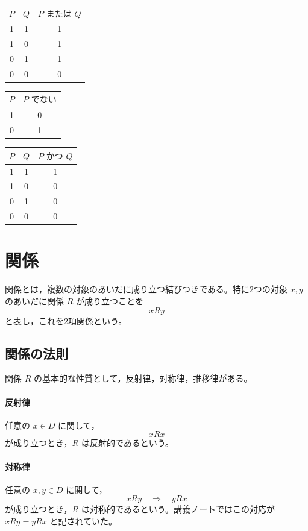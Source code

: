 \documentclass[../main.tex]{subfiles}
\begin{document}
\begin{center}
\begin{tabular}{ccc}
\toprule
\(P\) & \(Q\) & \(P \text{ または } Q\) \\
\midrule
1 & 1 & 1 \\
1 & 0 & 1 \\
0 & 1 & 1 \\
0 & 0 & 0 \\
\bottomrule
\end{tabular}
\qquad
\begin{tabular}{cc}
\toprule
\(P\) & \(P \text{ でない}\) \\
\midrule
1 & 0 \\
0 & 1 \\
\bottomrule
\end{tabular}
\qquad
\begin{tabular}{ccc}
\toprule
\(P\) & \(Q\) & \(P \text{ かつ } Q\) \\
\midrule
1 & 1 & 1 \\
1 & 0 & 0 \\
0 & 1 & 0 \\
0 & 0 & 0 \\
\bottomrule
\end{tabular}
\end{center}

\section{関係}

関係とは，複数の対象のあいだに成り立つ結びつきである。特に2つの対象 \(x,y\) のあいだに関係 \(R\) が成り立つことを
\[
  xRy
\]
と表し，これを2項関係という。

\subsection{関係の法則}

関係 \(R\) の基本的な性質として，反射律，対称律，推移律がある。

\paragraph{反射律}
任意の \(x \in D\) に関して，
\[
  xRx
\]
が成り立つとき，\(R\) は反射的であるという。

\paragraph{対称律}
任意の \(x,y \in D\) に関して，
\[
  xRy \quad \Rightarrow \quad yRx
\]
が成り立つとき，\(R\) は対称的であるという。講義ノートではこの対応が \(xRy = yRx\) と記されていた。
\end{document}
